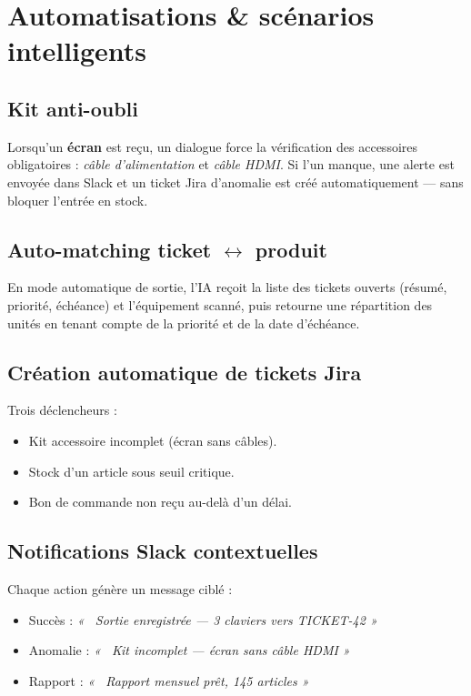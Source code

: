 \documentclass[11pt,a4paper]{article}
\begin{document}
\section{Automatisations \& scénarios intelligents}

\subsection{Kit anti-oubli}
Lorsqu'un \textbf{écran} est reçu, un dialogue force la vérification
des accessoires obligatoires : \emph{câble d'alimentation} et
\emph{câble HDMI}. Si l'un manque, une alerte est envoyée dans Slack
et un ticket Jira d'anomalie est créé automatiquement — sans bloquer
l'entrée en stock.

\subsection{Auto-matching ticket $\leftrightarrow$ produit}
En mode automatique de sortie, l'IA reçoit la liste des tickets
ouverts (résumé, priorité, échéance) et l'équipement scanné, puis
retourne une répartition des unités en tenant compte de la priorité
et de la date d'échéance.

\subsection{Création automatique de tickets Jira}
Trois déclencheurs :
\begin{itemize}
  \item Kit accessoire incomplet (écran sans câbles).
  \item Stock d'un article sous seuil critique.
  \item Bon de commande non reçu au-delà d'un délai.
\end{itemize}

\subsection{Notifications Slack contextuelles}
Chaque action génère un message ciblé :
\begin{itemize}
  \item Succès : \emph{« \checkmark~Sortie enregistrée — 3 claviers vers TICKET-42 »}
  \item Anomalie : \emph{« \faExclamationTriangle~Kit incomplet — écran sans câble HDMI »}
  \item Rapport : \emph{« \faFilePdf~Rapport mensuel prêt, 145 articles »}
\end{itemize}
\end{document}
